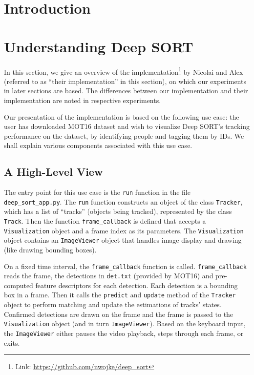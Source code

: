 \documentclass[conference]{IEEEtran}
\begin{document}
\section{Introduction}


\section{Understanding Deep SORT}

In this section, we give an overview of the implementation\footnote{Link: \url{https://github.com/nwojke/deep_sort}} by Nicolai and Alex \cite{Wojke2018deep} (referred to as ``their implementation'' in this section), on which our experiments in later sections are based. The differences between our implementation and their implementation are noted in respective experiments.

Our presentation of the implementation is based on the following use case: the user has downloaded MOT16 \cite{milan2016mot16} dataset and wish to visualize Deep SORT's tracking performance on the dataset, by identifying people and tagging them by IDs. We shall explain various components associated with this use case.

\subsection{A High-Level View}

The entry point for this use case is the \texttt{run} function in the file \texttt{deep\_sort\_app.py}. The \texttt{run} function constructs an object of the class \texttt{Tracker}, which has a list of ``tracks'' (objects being tracked), represented by the class \texttt{Track}. Then the function \texttt{frame\_callback} is defined that accepts a \texttt{Visualization} object and a frame index as its parameters. The \texttt{Visualization} object contains an \texttt{ImageViewer} object that handles image display and drawing (like drawing bounding boxes).

On a fixed time interval, the \texttt{frame\_callback} function is called. \texttt{frame\_callback} reads the frame, the detections in \texttt{det.txt} (provided by MOT16) and pre-computed feature descriptors for each detection. Each detection is a bounding box in a frame. Then it calls the \texttt{predict} and \texttt{update} method of the \texttt{Tracker} object to perform matching and update the estimations of tracks' states. Confirmed detections are drawn on the frame and the frame is passed to the \texttt{Visualization} object (and in turn \texttt{ImageViewer}). Based on the keyboard input, the \texttt{ImageViewer} either pauses the video playback, steps through each frame, or exits.
\end{document}

